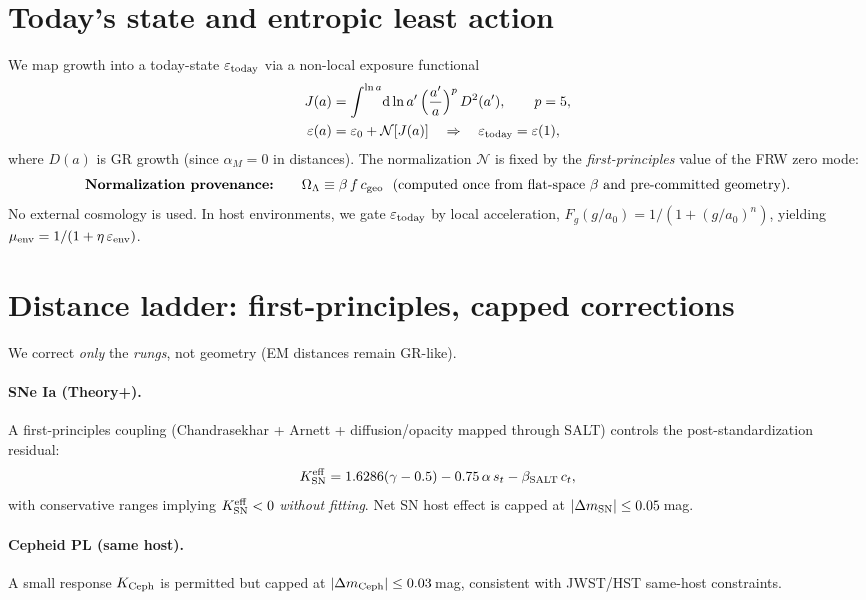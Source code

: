 \documentclass[aps,prd,preprint,onecolumn,longbibliography,nofootinbib]{revtex4-2}
\theoremstyle{plain}
\theoremstyle{remark}
\newcommand{\OmL}{\Omega_\Lambda}
\newcommand{\alM}{\alpha_{\!M}}
\newcommand{\be}{\beta}
\newcommand{\beS}{\beta_{\rm SALT}}
\newcommand{\dd}{\mathrm{d}}
\newcommand{\eps}{\varepsilon}
\begin{document}
\section{Today’s state and entropic least action}\label{sec:today_state}
We map growth into a today-state $\eps_{\rm today}$ via a non-local exposure functional
\begin{align}
J(a) &= \int^{\ln a}\! \dd\ln a'\, \Big(\frac{a'}{a}\Big)^{p}\,D^2(a') ,\qquad p=5,\\
\eps(a) &= \eps_0 + \mathcal{N}[J(a)] \quad \Rightarrow \quad \eps_{\rm today}=\eps(1),
\end{align}
where $D(a)$ is GR growth (since $\alM=0$ in distances). The normalization $\mathcal{N}$ is fixed by the \emph{first-principles} value of the FRW zero mode:
\[
\textbf{Normalization provenance:}\qquad \OmL\equiv \be\,f\,c_{\rm geo}\ \ \text{(computed once from flat-space $\be$ and pre-committed geometry)}.
\]
No external cosmology is used. In host environments, we gate $\eps_{\rm today}$ by local acceleration, $F_g(g/a_0)=1/(1+(g/a_0)^n)$, yielding $\mu_{\rm env}=1/(1+\eta\,\eps_{\rm env})$.

\section{Distance ladder: first-principles, capped corrections}\label{sec:ladder}
We correct \emph{only} the \emph{rungs}, not geometry (EM distances remain GR-like).

\paragraph*{SNe Ia (Theory+).}
A first-principles coupling (Chandrasekhar + Arnett + diffusion/opacity mapped through SALT) controls the post-standardization residual:
\begin{equation}
K^{\rm eff}_{\rm SN}=1.6286(\gamma-0.5)-0.75\,\alpha\,s_t-\beS\,c_t,
\end{equation}
with conservative ranges implying $K^{\rm eff}_{\rm SN}<0$ \emph{without fitting}. Net SN host effect is capped at $|\Delta m_{\rm SN}|\le 0.05$\,mag.

\paragraph*{Cepheid PL (same host).}
A small response $K_{\rm Ceph}$ is permitted but capped at $|\Delta m_{\rm Ceph}|\le 0.03$\,mag, consistent with JWST/HST same-host constraints.
\end{document}
